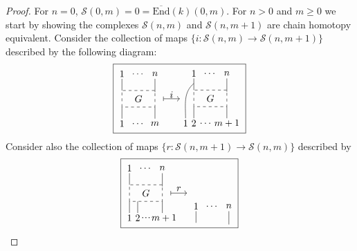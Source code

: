 \documentclass{amsart}
\renewcommand{\S}{\mathcal{S}}
\newcommand{\End}{\mathrm{End}}
\theoremstyle{definition}
\begin{document}
	\begin{proof} 			
		For $n=0$, $\S(0,m)=0=\overline{\End}(k)(0,m)$. For $n>0$ and $m\geq0$ we start by showing the complexes $\S(n,m)$ and $\S(n,m+1)$ are chain homotopy equivalent. Consider the collection of maps $\{i:\S(n,m)\to\S(n,m+1)\}$ described by the following diagram:
		\begin{equation*}
		\boxed{\begin{tikzpicture}[scale=.6]
			\node at (0,2) {$1$}; \draw (0,1.7) -- (0,1);
			\node at (1,2) {$\dots$};
			\node at (2,2) {$n$}; \draw (2,1.7) -- (2,.9);
			
			\draw [dashed] (0,0) rectangle (2,1); \node at (1, .5) {$G$};
			
			\node at (0,-1) {$1$}; \draw (0,-.7) -- (0,0);
			\node at (1,-1) {$\dots$};
			\node at (2,-1) {$m$}; \draw (2,-.7) -- (2,0);
			
			\node at (3,.75) {$i$}; \draw [|->] (2.5,.5) -- (3.5,.5);
			\end{tikzpicture}
			\begin{tikzpicture}[scale=.6]
			\node at (0,2) {$1$}; \draw (0,1.7) -- (0,1);
			\node at (1,2) {$\dots$};
			\node at (2,2) {$n$}; \draw (2,1.7) -- (2,.9);
			
			\draw [dashed] (0,0) rectangle (2,1); \node at (1, .5) {$G$};
			
			\node at (-.5,-1) {$1$}; \draw (-.5,-.7)  to[out=90,in=-140]  (0,1.4);
			\node at (0,-1) {$2$}; \draw (0,-.7) -- (0,0);
			\node at (.75,-1) {$\dots$};
			\node at (2,-1) {$m+1$}; \draw (2,-.7) -- (2,0);
			\end{tikzpicture}}
		\end{equation*}
		Consider also the collection of maps $\{r:\S(n,m+1)\to\S(n,m)\}$ described by
		\begin{equation*}
		\boxed{\begin{tikzpicture}[scale=.6]
			\node at (0,2) {$1$}; \draw (0,1.7) -- (0,1);
			\node at (1,2) {$\dots$};
			\node at (2,2) {$n$}; \draw (2,1.7) -- (2,.9);
			
			\draw [dashed] (0,0) rectangle (2,1); \node at (1, .5) {$G$};
			
			\draw (0,-.7) -- (0,0);
			\node at (0,-1) {$1$};
			\node at (.5,-1) {$2$}; \draw (.5,-.7) -- (.5,0);
			\node at (1,-1) {$\cdot\!\cdot\!\cdot$};
			\node at (2.1,-1) {$m+1$}; \draw (2,-.7) -- (2,0);
			
			\node at (3,.75) {$r$}; \draw [|->] (2.5,.5) -- (3.5,.5);
			\end{tikzpicture}
			\ %
			\begin{tikzpicture}[scale=.6]
			\node at (0,2) {$1$}; \draw (0,1.7) -- (0,1);
			\node at (1,2) {$\dots$};
			\node at (2,2) {$n$}; \draw (2,1.7) -- (2,.9);
			

\end{tikzpicture}}
\end{equation*}
\end{proof}
\end{document}
